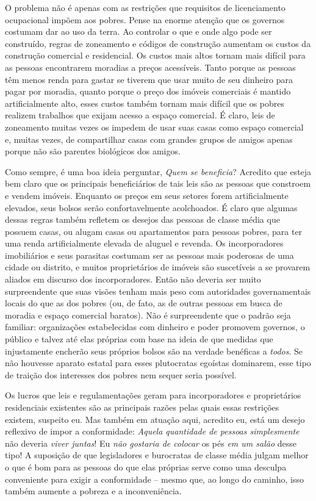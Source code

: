 O problema não é apenas com as restrições que requisitos de licenciamento ocupacional impõem aos pobres. Pense na enorme atenção que os governos costumam dar ao uso da terra. Ao controlar o que e onde algo pode ser construído, regras de zoneamento e códigos de construção aumentam os custos da construção comercial e residencial. Os custos mais altos tornam mais difícil para as pessoas encontrarem moradias a preços acessíveis. Tanto porque as pessoas têm menos renda para gastar se tiverem que usar muito de seu dinheiro para pagar por moradia, quanto porque o preço dos imóveis comerciais é mantido artificialmente alto, esses custos também tornam mais difícil que os pobres realizem trabalhos que exijam acesso a espaço comercial. É claro, leis de zoneamento muitas vezes os impedem de usar suas casas como espaço comercial e, muitas vezes, de compartilhar casas com grandes grupos de amigos apenas porque não são parentes biológicos dos amigos.

Como sempre, é uma boa ideia perguntar, \emph{Quem se beneficia}? Acredito que esteja bem claro que os principais beneficiários de tais leis são as pessoas que constroem e vendem imóveis. Enquanto os preços em seus setores forem artificialmente elevados, seus bolsos serão confortavelmente acolchoados. É claro que algumas dessas regras também refletem os desejos das pessoas de classe média que possuem casas, ou alugam casas ou apartamentos para pessoas pobres, para ter uma renda artificialmente elevada de aluguel e revenda. Os incorporadores imobiliários e seus parasitas costumam ser as pessoas mais poderosas de uma cidade ou distrito, e muitos proprietários de imóveis são suscetíveis a se provarem aliados em discurso dos incorporadores. Então não deveria ser muito surpreendente que suas visões tenham mais peso com autoridades governamentais locais do que as dos pobres (ou, de fato, as de outras pessoas em busca de moradia e espaço comercial baratos). Não é surpreendente que o padrão seja familiar: organizações estabelecidas com dinheiro e poder promovem governos, o público e talvez até elas próprias com base na ideia de que medidas que injustamente encherão seus próprios bolsos são na verdade benéficas a \emph{todos}. Se não houvesse aparato estatal para esses plutocratas egoístas dominarem, esse tipo de traição dos interesses dos pobres nem sequer seria possível.

Os lucros que leis e regulamentações geram para incorporadores e proprietários residenciais existentes são as principais razões pelas quais essas restrições existem, suspeito eu. Mas também em atuação aqui, acredito eu, está um desejo reflexivo de impor a conformidade: \emph{Aquela quantidade de pessoas simplesmente} não deveria \emph{viver juntas}! Eu \emph{não gostaria de colocar} os pés \emph{em um salão} desse tipo! A suposição de que legisladores e burocratas de classe média julgam melhor o que é bom para as pessoas do que elas próprias serve como uma desculpa conveniente para exigir a conformidade -- mesmo que, ao longo do caminho, isso também aumente a pobreza e a inconveniência.

